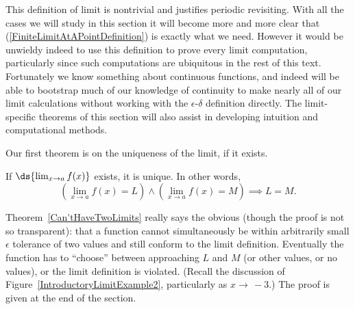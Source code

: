 
This definition of limit is nontrivial and justifies periodic
revisiting. With all the cases we will study in this section it will
become more and more clear that (\ref{FiniteLimitAtAPointDefinition})
is exactly what we need.
However it would be unwieldy indeed to use this definition to prove
every limit computation, particularly since such computations
are ubiquitous in the rest of this text.
Fortunately we know something about continuous functions,
and indeed  will be able to 
bootstrap much of our knowledge of continuity to
make nearly all of our
limit calculations without working with the $\epsilon$-$\delta$
definition directly.  The limit-specific theorems of this section will
also assist in developing intuition and computational methods.

Our first theorem is on the uniqueness of the limit,
if it exists.  

\begin{theorem}
If $\ds{\lim_{x\to a}f(x)}$ exists, it is unique. In other words,
$$\left(\lim_{x\to a}f(x)=L\right)
\wedge\left(\lim_{x\to a}f(x)=M\right)
\implies L=M.$$
\label{Can'tHaveTwoLimits}\end{theorem}


Theorem~\ref{Can'tHaveTwoLimits} really says the obvious (though
the proof is not so transparent): that a function cannot
simultaneously be within arbitrarily small $\epsilon$ tolerance of two
values and still conform to the limit definition.  Eventually the function
has to ``choose'' between approaching $L$ and $M$
(or other values, or no values), or the
limit definition is violated.  (Recall the discussion
of Figure~\ref{IntroductoryLimitExample2}, particularly 
as $x\to\,-3$.)  The proof is given at the end of the section.

